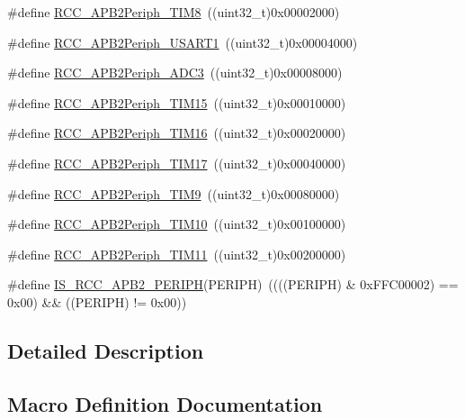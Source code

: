 \begin{DoxyCompactItemize}
\item 
\#define \hyperlink{group___a_p_b2__peripheral_gac951d41a08140a7d38a4faff8dd1e03e}{R\+C\+C\+\_\+\+A\+P\+B2\+Periph\+\_\+\+T\+I\+M8}~((uint32\+\_\+t)0x00002000)
\item 
\#define \hyperlink{group___a_p_b2__peripheral_ga14e1b3b6d84801c223a37a954b5b1910}{R\+C\+C\+\_\+\+A\+P\+B2\+Periph\+\_\+\+U\+S\+A\+R\+T1}~((uint32\+\_\+t)0x00004000)
\item 
\#define \hyperlink{group___a_p_b2__peripheral_ga371d55bbf17bf965a213c59f2d276d72}{R\+C\+C\+\_\+\+A\+P\+B2\+Periph\+\_\+\+A\+D\+C3}~((uint32\+\_\+t)0x00008000)
\item 
\#define \hyperlink{group___a_p_b2__peripheral_ga774f9082c3331890c06b9fd9deafe549}{R\+C\+C\+\_\+\+A\+P\+B2\+Periph\+\_\+\+T\+I\+M15}~((uint32\+\_\+t)0x00010000)
\item 
\#define \hyperlink{group___a_p_b2__peripheral_ga739d0a5fe583f07f5b6fa320f2d2e53a}{R\+C\+C\+\_\+\+A\+P\+B2\+Periph\+\_\+\+T\+I\+M16}~((uint32\+\_\+t)0x00020000)
\item 
\#define \hyperlink{group___a_p_b2__peripheral_ga5a6217b6200d6679dc7bee4522d6038a}{R\+C\+C\+\_\+\+A\+P\+B2\+Periph\+\_\+\+T\+I\+M17}~((uint32\+\_\+t)0x00040000)
\item 
\#define \hyperlink{group___a_p_b2__peripheral_ga24d0145dc172bc27ed580770cf15e4d9}{R\+C\+C\+\_\+\+A\+P\+B2\+Periph\+\_\+\+T\+I\+M9}~((uint32\+\_\+t)0x00080000)
\item 
\#define \hyperlink{group___a_p_b2__peripheral_ga75069120ecbe86920b39c2b75c909438}{R\+C\+C\+\_\+\+A\+P\+B2\+Periph\+\_\+\+T\+I\+M10}~((uint32\+\_\+t)0x00100000)
\item 
\#define \hyperlink{group___a_p_b2__peripheral_gaba591104f4e31b1e8ce98c269035850f}{R\+C\+C\+\_\+\+A\+P\+B2\+Periph\+\_\+\+T\+I\+M11}~((uint32\+\_\+t)0x00200000)
\item 
\#define \hyperlink{group___a_p_b2__peripheral_ga89a2b95e60e90a51b26b53cc4c0e7b14}{I\+S\+\_\+\+R\+C\+C\+\_\+\+A\+P\+B2\+\_\+\+P\+E\+R\+I\+PH}(P\+E\+R\+I\+PH)~((((P\+E\+R\+I\+PH) \& 0x\+F\+F\+C00002) == 0x00) \&\& ((\+P\+E\+R\+I\+P\+H) != 0x00))
\end{DoxyCompactItemize}


\subsection{Detailed Description}


\subsection{Macro Definition Documentation}
\mbox{\label{group___a_p_b2__peripheral_ga89a2b95e60e90a51b26b53cc4c0e7b14}} 
